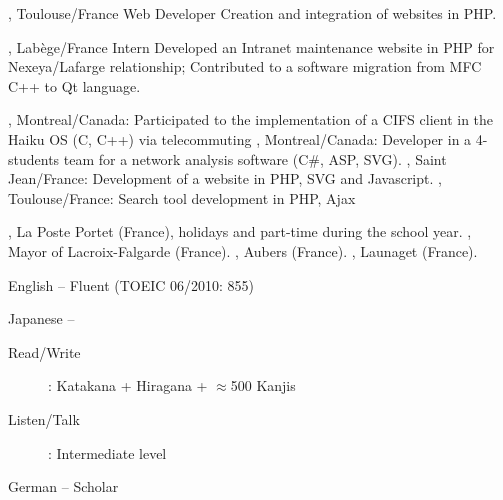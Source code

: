 \documentclass[english]{ecv}
\begin{document}
\begin{ecv}
                 {, Toulouse/France}
                 {Web Developer}
                 {Creation and integration of websites in PHP.
                 }

                 {, Lab\`ege/France}
                 {Intern
                 }
                 {Developed an Intranet maintenance website in PHP for Nexeya/Lafarge
                  relationship; Contributed to a software migration from MFC C++
                  to Qt language.
                 }

                 {, Montreal/Canada: Participated
                  to the implementation of a CIFS client in the Haiku OS (C, C++)
                  via telecommuting}
                 {, Montreal/Canada:
                 Developer in a 4-students team for a network analysis software
                 (C\#, ASP, SVG).
                 }
                 {, Saint Jean/France: Development of a
                 website in PHP, SVG and Javascript.
                 }
                 {, Toulouse/France:
                 Search tool development in PHP, Ajax
                 }

 {, La Poste Portet (France), holidays and
part-time during the school year.}
 {, Mayor of Lacroix-Falgarde (France).}
 {, Aubers (France).}
 {, Launaget (France).}


\ecvPageBreak



 {
  \begin{description}
    \begin{spacing}{-1}
    \item[English] -- Fluent (TOEIC 06/2010: 855)
    \item[Japanese] -- 
      \begin{description}
        \item[Read/Write]: Katakana + Hiragana + $\approx$500 Kanjis
        \item[Listen/Talk]: Intermediate level\ecvNewLine
      \end{description}
    \item[German] -- Scholar
    \end{spacing}
  \end{description}
}


\end{ecv}
\end{document}
